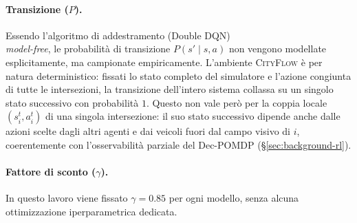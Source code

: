 \paragraph{Transizione ($P$).} Essendo l'algoritmo di addestramento (Double DQN) \\
\emph{model-free}, le probabilità di transizione $P(s'\mid s,a)$ non vengono modellate esplicitamente, ma campionate empiricamente.
L'ambiente \textsc{CityFlow} è per natura deterministico: fissati lo stato
completo del simulatore e l'azione congiunta di tutte le intersezioni, la
transizione dell'intero sistema collassa su un singolo stato successivo
con probabilità $1$. Questo non vale però per la coppia locale
$(s_i^t, a_i^t)$ di una singola intersezione: il suo stato successivo
dipende anche dalle azioni scelte dagli altri agenti e dai veicoli fuori
dal campo visivo di $i$, coerentemente con l'osservabilità parziale del
Dec-POMDP (§\ref{sec:background-rl}).

\paragraph{Fattore di sconto ($\gamma$).} In questo lavoro viene fissato $\gamma = 0.85$ per ogni modello, senza alcuna ottimizzazione iperparametrica dedicata.

